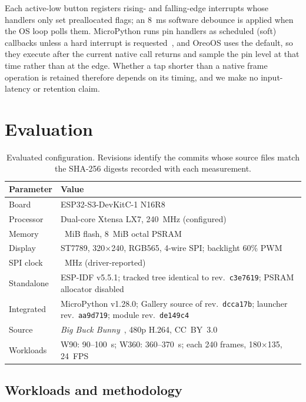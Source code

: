 \documentclass[11pt,twocolumn]{article}
\begin{document}
Each active-low button registers rising- and falling-edge interrupts whose
handlers only set preallocated flags; an 8~ms software debounce is applied
when the OS loop polls them.  MicroPython runs pin handlers as scheduled
(soft) callbacks unless a hard interrupt is requested~\cite{micropython2026pin},
and OreoOS uses the default, so they execute after the current native call
returns and sample the pin level at that time rather than at the edge.
Whether a tap shorter than a native frame operation is retained therefore
depends on its timing, and we make no input-latency or retention claim.

\section{Evaluation}
\label{sec:evaluation}

\begin{table}[t]
\centering
\caption{Evaluated configuration.  Revisions identify the commits whose
source files match the SHA-256 digests recorded with each measurement.}
\label{tab:platform}
\begin{tabular}{@{}>{\raggedright\arraybackslash}p{}%
                >{\raggedright\arraybackslash}p{}@{}}
\toprule
Parameter & Value \\
\midrule
Board & ESP32-S3-DevKitC-1 N16R8 \\
Processor & Dual-core Xtensa LX7, 240~MHz (configured) \\
Memory & 16~MiB flash, 8~MiB octal PSRAM \\
Display & ST7789, 320$\times$240, RGB565, 4-wire SPI; backlight 60\% PWM \\
SPI clock & 40~MHz (driver-reported) \\
Standalone & ESP-IDF v5.5.1; tracked tree identical to rev.\ \texttt{c3e7619}; PSRAM allocator disabled \\
Integrated & MicroPython v1.28.0; Gallery source of rev.\ \texttt{dcca17b}; launcher rev.\ \texttt{aa9d719}; module rev.\ \texttt{de149c4} \\
Source & \emph{Big Buck Bunny}~\cite{blender2008bbb}, 480p H.264, CC~BY~3.0 \\
Workloads & W90: 90--100~s; W360: 360--370~s; each 240 frames, 180$\times$135, 24~FPS \\
\bottomrule
\end{tabular}
\end{table}

\subsection{Workloads and methodology}
\end{document}
